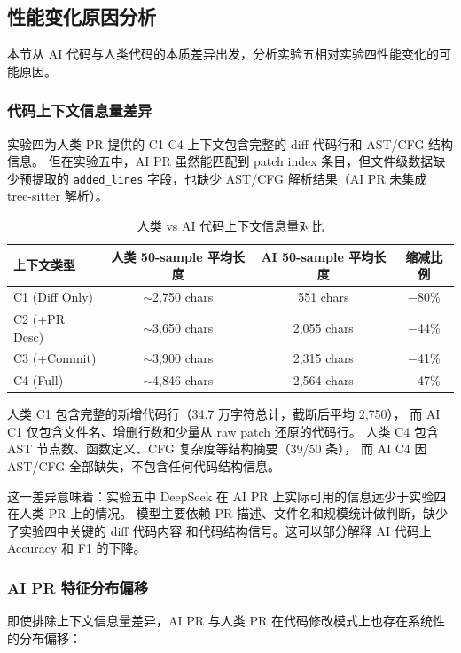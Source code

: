 \documentclass{experimentreport}
\begin{document}
\subsection{性能变化原因分析}

本节从 AI 代码与人类代码的本质差异出发，分析实验五相对实验四性能变化的可能原因。

\subsubsection{代码上下文信息量差异}

实验四为人类 PR 提供的 C1-C4 上下文包含完整的 diff 代码行和 AST/CFG 结构信息。
但在实验五中，AI PR 虽然能匹配到 patch index 条目，但文件级数据缺少预提取的
\texttt{added\_lines} 字段，也缺少 AST/CFG 解析结果（AI PR 未集成 tree-sitter 解析）。

\begin{table}[htbp]
\centering
\caption{人类 vs AI 代码上下文信息量对比}
\begin{tabular}{lccc}
\toprule
上下文类型 & 人类 50-sample 平均长度 & AI 50-sample 平均长度 & 缩减比例 \\
\midrule
C1 (Diff Only) & $\sim$2,750 chars & 551 chars & $-$80\% \\
C2 (+PR Desc)  & $\sim$3,650 chars & 2,055 chars & $-$44\% \\
C3 (+Commit)   & $\sim$3,900 chars & 2,315 chars & $-$41\% \\
C4 (Full)      & $\sim$4,846 chars & 2,564 chars & $-$47\% \\
\bottomrule
\end{tabular}
\end{table}

人类 C1 包含完整的新增代码行（34.7 万字符总计，截断后平均 2,750），
而 AI C1 仅包含文件名、增删行数和少量从 raw patch 还原的代码行。
人类 C4 包含 AST 节点数、函数定义、CFG 复杂度等结构摘要（39/50 条），
而 AI C4 因 AST/CFG 全部缺失，不包含任何代码结构信息。

这一差异意味着：实验五中 DeepSeek 在 AI PR 上实际可用的信息远少于实验四在人类 PR 上的情况。
模型主要依赖 PR 描述、文件名和规模统计做判断，缺少了实验四中关键的 diff 代码内容
和代码结构信号。这可以部分解释 AI 代码上 Accuracy 和 F1 的下降。

\subsubsection{AI PR 特征分布偏移}

即使排除上下文信息量差异，AI PR 与人类 PR 在代码修改模式上也存在系统性的分布偏移：
\end{document}
